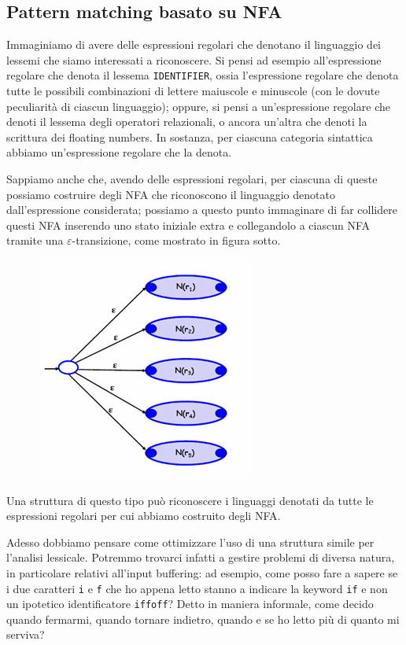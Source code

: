 \documentclass[class=book, crop=false, oneside, 12pt]{standalone}
\begin{document}
\subsection{Pattern matching basato su NFA}
Immaginiamo di avere delle espressioni regolari che denotano il linguaggio dei lessemi che siamo interessati a riconoscere. Si pensi ad esempio all'espressione regolare che denota il lessema \texttt{IDENTIFIER}, ossia l'espressione regolare che denota tutte le possibili combinazioni di lettere maiuscole e minuscole (con le dovute peculiarità di ciascun linguaggio); oppure, si pensi a un'espressione regolare che denoti il lessema degli operatori relazionali, o ancora un'altra che denoti la scrittura dei floating numbers. In sostanza, per ciascuna categoria sintattica abbiamo un'espressione regolare che la denota.

Sappiamo anche che, avendo delle espressioni regolari, per ciascuna di queste possiamo costruire degli NFA che riconoscono il linguaggio denotato dall'espressione considerata; possiamo a questo punto immaginare di far collidere questi NFA inserendo uno stato iniziale extra e collegandolo a ciascun NFA tramite una \(\varepsilon\)-transizione, come mostrato in figura sotto.
\begin{figure}[H]
    \centering
    \includegraphics[width=.4\textwidth,keepaspectratio]{lec-14-2}
    \caption{}
\end{figure}
Una struttura di questo tipo può riconoscere i linguaggi denotati da tutte le espressioni regolari per cui abbiamo costruito degli NFA. 

Adesso dobbiamo pensare come ottimizzare l'uso di una struttura simile per l'analisi lessicale. Potremmo trovarci infatti a gestire problemi di diversa natura, in particolare relativi all'input buffering: ad esempio, come posso fare a sapere se i due caratteri \texttt{i} e \texttt{f} che ho appena letto stanno a indicare la keyword \texttt{if} e non un ipotetico identificatore \texttt{iffoff}? Detto in maniera informale, come decido quando fermarmi, quando tornare indietro, quando e se ho letto più di quanto mi serviva?
\end{document}
